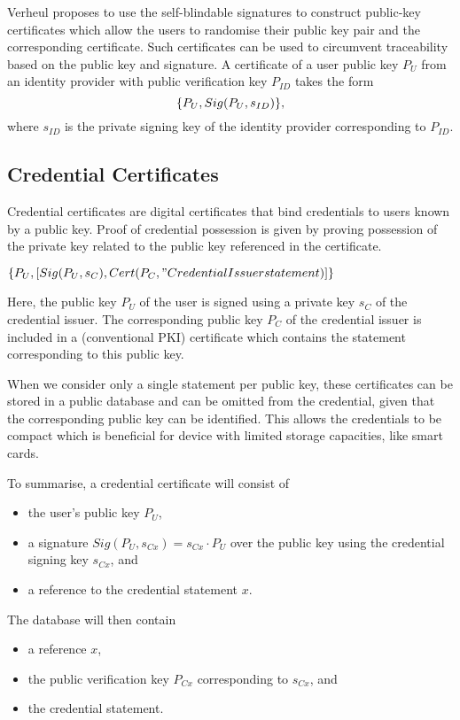Verheul proposes to use the self-blindable signatures to construct public-key
certificates which allow the users to randomise their public key pair and the
corresponding certificate. Such certificates can be used to circumvent
traceability based on the public key and signature. A certificate of a user
public key $P_U$ from an identity provider with public verification key $P_{ID}$
takes the form
\begin{equation}\label{eqn:SB-certificate}
  \{ P_U, Sig(P_U, s_{ID}) \}\text,
\end{equation}
where $s_{ID}$ is the private signing key of the identity provider corresponding
to $P_{ID}$.

\subsection{Credential Certificates}

Credential certificates are digital certificates that bind credentials to users
known by a public key. Proof of credential possession is given by proving
possession of the private key related to the public key referenced in the
certificate.

$\{P_U, [Sig(P_U, s_C), Cert(P_C, "Credential Issuer statement)]\}$

Here, the public key $P_U$ of the user is signed using a private key $s_C$ of
the credential issuer. The corresponding public key $P_C$ of the credential
issuer is included in a (conventional PKI) certificate which contains the
statement corresponding to this public key.

When we consider only a single statement per public key, these certificates can
be stored in a public database and can be omitted from the credential, given
that the corresponding public key can be identified. This allows the credentials
to be compact which is beneficial for device with limited storage capacities,
like smart cards.

To summarise, a credential certificate will consist of
\begin{itemize}
  \item the user's public key $P_U$,
  \item a signature $Sig(P_U, s_{Cx}) = s_{Cx} \cdot P_U$ over the public key
    using the credential signing key $s_{Cx}$, and
  \item a reference to the credential statement $x$.
\end{itemize}
The database will then contain
\begin{itemize}
  \item a reference $x$,
  \item the public verification key $P_{Cx}$ corresponding to $s_{Cx}$, and
  \item the credential statement.
\end{itemize}

